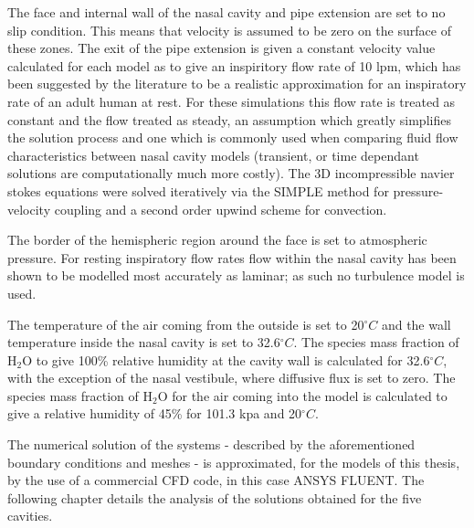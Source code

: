 The face and internal wall of the nasal cavity and pipe extension are set to no slip condition. This means that velocity is assumed to be zero on the surface of these zones. The exit of the pipe extension is given a constant velocity value calculated for each model as to give an inspiritory flow rate of 10 lpm, which has been suggested by the literature to be a realistic approximation for an inspiratory rate of an adult human at rest. For these simulations this flow rate is treated as constant and the flow treated as steady, an assumption which greatly simplifies the solution process and one which is commonly used when comparing fluid flow characteristics between nasal cavity models (transient, or time dependant solutions are computationally much more costly). The 3D incompressible navier stokes equations were solved iteratively via the SIMPLE method for pressure-velocity coupling and a second order upwind scheme for convection.

The border of the hemispheric region around the face is set to atmospheric pressure. For resting inspiratory flow rates flow within the nasal cavity has been shown to be modelled most accurately as laminar; as such no turbulence model is used.

The temperature of the air coming from the outside is set to 20$^{\circ} C$ and the wall temperature inside the nasal cavity is set to 32.6$^{\circ} C$.  The species mass fraction of $\mathrm{H_2 O}$ to give 100\% relative humidity at the cavity wall is calculated for 32.6$^{\circ} C$, with the exception of the nasal vestibule, where diffusive flux is set to zero. The species mass fraction of $\mathrm{H_2 O}$ for the air coming into the model is calculated to give a relative humidity of 45\% for 101.3 kpa and 20$^{\circ} C$.

The numerical solution of the systems - described by the aforementioned boundary conditions and meshes - is approximated, for the models of this thesis, by the use of a commercial CFD code, in this case ANSYS FLUENT. The following chapter details the analysis of the solutions obtained for the five cavities.
